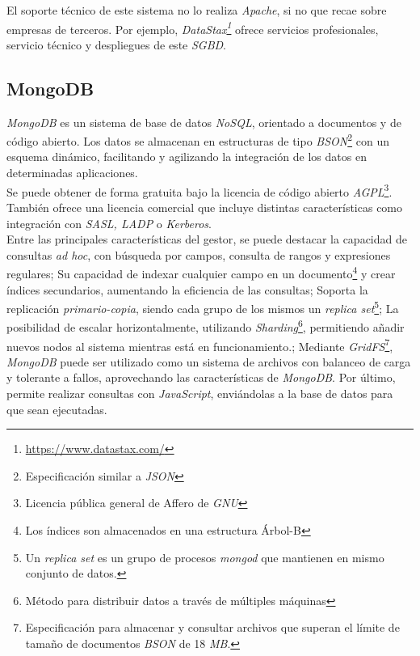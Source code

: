 \documentclass[3pt]{article}
\begin{document}
El soporte técnico de este sistema no lo realiza \emph{Apache}, si no que recae sobre empresas de terceros. Por ejemplo, \emph{DataStax\footnote{\url{https://www.datastax.com/}}} ofrece servicios profesionales, servicio técnico y despliegues de este \emph{SGBD}. \cite{APW:1}\\

\subsection{MongoDB}

\emph{MongoDB} es un sistema de base de datos \emph{NoSQL}, orientado a documentos y de código abierto. Los datos se almacenan en estructuras de tipo \emph{BSON}\footnote{Especificación similar a \emph{JSON}} con un esquema dinámico, facilitando y agilizando la integración de los datos en determinadas aplicaciones.\\
Se puede obtener de forma gratuita bajo la licencia de código abierto  \emph{AGPL}\footnote{Licencia pública general de Affero de \emph{GNU}}. También ofrece una licencia comercial que incluye distintas características como integración con \emph{SASL, LADP} o \emph{Kerberos}.\cite{WIKI:13}\\

Entre las principales características del gestor\cite{WIKI:14}, se puede destacar la capacidad de consultas \emph{ad hoc}, con búsqueda por campos, consulta de rangos y expresiones regulares; Su capacidad de indexar cualquier campo en un documento\footnote{Los índices son almacenados en una estructura Árbol-B} y crear índices secundarios, aumentando la eficiencia de las consultas\cite{MDB:1}; Soporta la replicación \emph{primario-copia}, siendo cada grupo de los mismos un \emph{replica set}\footnote{Un \emph{replica set} es un grupo de procesos \emph{mongod} que mantienen en mismo conjunto de datos.\cite{MDB:2}}; La posibilidad de escalar horizontalmente, utilizando \emph{Sharding}\footnote{Método para distribuir datos a través de múltiples máquinas}, permitiendo añadir nuevos nodos al sistema mientras está en funcionamiento.\cite{MDB:3};  Mediante \emph{GridFS}\footnote{Especificación para almacenar y consultar archivos que superan el límite de tamaño de documentos \emph{BSON} de 18 \emph{MB}.\cite{MDB:4}}, \emph{MongoDB} puede ser utilizado como un sistema de archivos con balanceo de carga y tolerante a fallos, aprovechando las características de \emph{MongoDB}. Por último, permite realizar consultas con \emph{JavaScript}\cite{MDB:5}, enviándolas a la base de datos para que sean ejecutadas.\\
\end{document}
